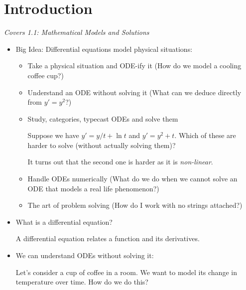 \section{Introduction}
\textit{Covers 1.1: Mathematical Models and Solutions}
\begin{itemize}
    \item Big Idea: Differential equations model physical situations:
          \begin{itemize}
              \item Take a physical situation and ODE-ify it (How do we model a cooling coffee cup?)
              \item Understand an ODE without solving it (What can we deduce directly from $y'=y^2$?)
              \item Study, categories, typecast ODEs and solve them
                    \begin{example}
                        Suppose we have $y'=y/t+\ln t$ and $y'=y^2+t$. Which of these are harder to solve (without actually solving them)?
                        \vspace{2mm}

                        It turns out that the second one is harder as it is \textit{non-linear}.
                    \end{example}
              \item Handle ODEs numerically (What do we do when we cannot solve an ODE that models a real life phenomenon?)
              \item The art of problem solving (How do I work with no strings attached?)
          \end{itemize}
    \item What is a differential equation?
          \begin{definition}
              A differential equation relates a function and its derivatives.
          \end{definition}
    \item We can understand ODEs without solving it:
          \begin{example}
              Let's consider a cup of coffee in a room. We want to model its change in temperature over time. How do we do this?
              \vspace{2mm}


\end{example}
\end{itemize}
